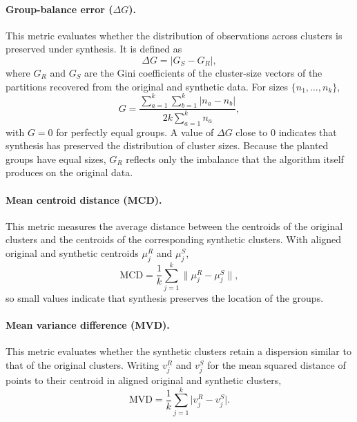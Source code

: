 \documentclass[pdflatex,sn-basic]{sn-jnl}
\begin{document}
\paragraph{Group-balance error ($\Delta G$).}
This metric evaluates whether the distribution of observations across clusters
is preserved under synthesis. It is defined as
\begin{equation}
  \Delta G = \bigl| G_S - G_R \bigr|,
  \label{eq:dgini}
\end{equation}
where $G_R$ and $G_S$ are the Gini coefficients of the cluster-size vectors of
the partitions recovered from the original and synthetic data. For sizes
$\{n_1,\dots,n_k\}$,
\begin{equation}
  G = \frac{\sum_{a=1}^{k}\sum_{b=1}^{k} |n_a - n_b|}
           {2k \sum_{a=1}^{k} n_a},
  \label{eq:gini}
\end{equation}
with $G = 0$ for perfectly equal groups. A value of $\Delta G$ close to $0$
indicates that synthesis has preserved the distribution of cluster sizes.
Because the planted groups have equal sizes, $G_R$ reflects only the imbalance
that the algorithm itself produces on the original data.

\paragraph{Mean centroid distance (MCD).}
This metric measures the average distance between the centroids of the
original clusters and the centroids of the corresponding synthetic clusters.
With aligned original and synthetic centroids $\mu_j^R$ and $\mu_j^S$,
\begin{equation}
  \mathrm{MCD} = \frac{1}{k} \sum_{j=1}^{k}
    \bigl\lVert \mu_j^R - \mu_j^S \bigr\rVert ,
  \label{eq:mcd}
\end{equation}
so small values indicate that synthesis preserves the location of the groups.

\paragraph{Mean variance difference (MVD).}
This metric evaluates whether the synthetic clusters retain a dispersion
similar to that of the original clusters. Writing $v_j^R$ and $v_j^S$ for the
mean squared distance of points to their centroid in aligned original and
synthetic clusters,
\begin{equation}
  \mathrm{MVD} = \frac{1}{k} \sum_{j=1}^{k} \bigl| v_j^R - v_j^S \bigr| .
  \label{eq:mvd}
\end{equation}
\end{document}

